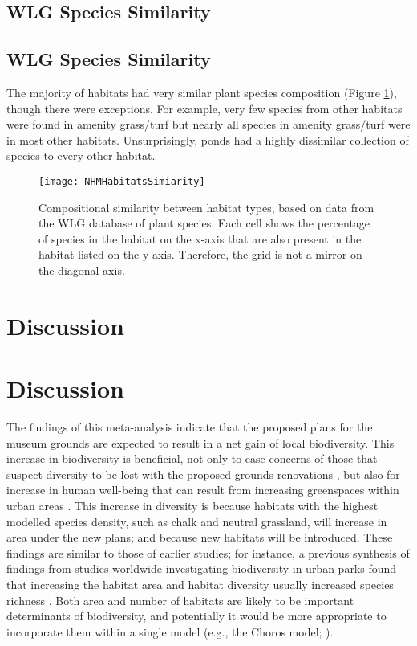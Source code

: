 \subsection{WLG Species Similarity}%
\else
\subsection*{WLG Species Similarity}
\fi
The majority of habitats had very similar plant species composition (Figure \ref{fig:wlgsimilarity}), though there were exceptions. For example, very few species from other habitats were found in amenity grass/turf but nearly all species in amenity grass/turf were in most other habitats. Unsurprisingly, ponds had a highly dissimilar collection of species to every other habitat.


\begin{figure}[t]
	\centering
	\texttt{[image: NHMHabitatsSimiarity]}
	\caption{Compositional similarity between habitat types, based on data from the WLG database of plant species. Each cell shows the percentage of species in the habitat on the x-axis that are also present in the habitat listed on the y-axis. Therefore, the grid is not a mirror on the diagonal axis.}
   	 \label{fig:wlgsimilarity}
\end{figure}

\ifappendixStyle %
\section{Discussion}%
\else
\section*{Discussion}
\fi

The findings of this meta-analysis indicate that the proposed plans for the museum grounds are expected to result in a net gain of local biodiversity. This increase in biodiversity is beneficial, not only to ease concerns of those that suspect diversity to be lost with the proposed grounds renovations \citep{changepetition:2015wg,avery:2015wg}, but also for increase in human well-being that can result from increasing greenspaces within urban areas \citep{Fuller:2007bl,Shanahan:2016sr}. This increase in diversity is because habitats with the highest modelled species density, such as chalk and neutral grassland, will increase in area under the new plans; and because new habitats will be introduced. These findings are similar to those of earlier studies; for instance, a previous synthesis of findings from studies worldwide investigating biodiversity in urban parks found that increasing the habitat area and habitat diversity usually increased species richness \citep{Nielsen:2014ue}. Both area and number of habitats are likely to be important determinants of biodiversity, and potentially it would be more appropriate to incorporate them within a single model (e.g., the Choros model; \citealt{Triantis:2003jb}).

